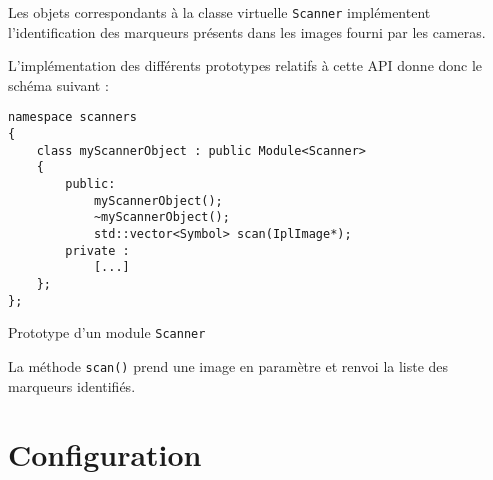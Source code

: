 \documentclass[10pt,a4paper,twoside, twocolumn]{report}
\begin{document}
Les objets correspondants à la classe virtuelle \texttt{Scanner} implémentent l’identification des marqueurs présents dans les images fourni par les cameras.

L’implémentation des différents prototypes relatifs à cette API donne donc le schéma suivant :

\begin{code}[ht!]\centering
	\begin{lstlisting}
namespace scanners
{
	class myScannerObject : public Module<Scanner>
	{
		public:
			myScannerObject();
			~myScannerObject();
			std::vector<Symbol>	scan(IplImage*);
		private :
			[...]
	};
};
	\end{lstlisting}
	\caption{Prototype d’un module \texttt{Scanner}}
\end{code}

La méthode \texttt{scan()} prend une image en paramètre et renvoi la liste des marqueurs identifiés.



\section{Configuration}
\end{document}
